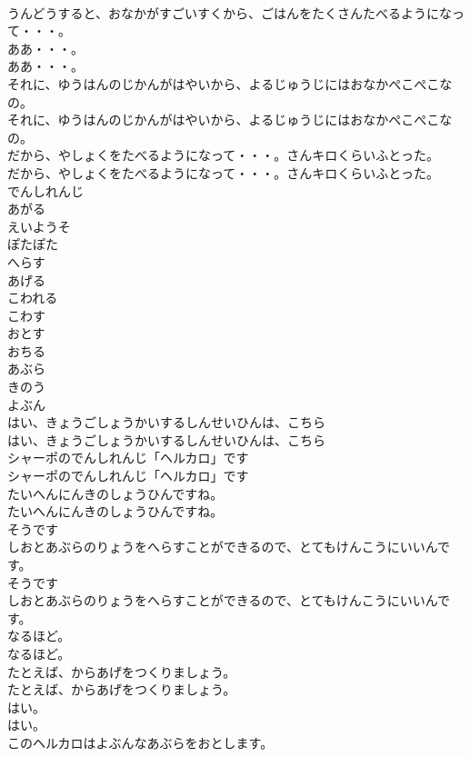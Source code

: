 \documentclass[8pt]{extreport}
\begin{document}
\begin{CJK}{UTF8}{min}
\\	うんどうすると、おなかがすごいすくから、ごはんをたくさんたべるようになって・・・。
\\	ああ・・・。
\\	ああ・・・。
\\	それに、ゆうはんのじかんがはやいから、よるじゅうじにはおなかぺこぺこなの。
\\	それに、ゆうはんのじかんがはやいから、よるじゅうじにはおなかぺこぺこなの。
\\	だから、やしょくをたべるようになって・・・。さんキロくらいふとった。
\\	だから、やしょくをたべるようになって・・・。さんキロくらいふとった。
\\	でんしれんじ
\\	あがる
\\	えいようそ
\\	ぽたぽた
\\	へらす
\\	あげる
\\	こわれる
\\	こわす
\\	おとす
\\	おちる
\\	あぶら
\\	きのう
\\	よぶん
\\	はい、きょうごしょうかいするしんせいひんは、こちら
\\	はい、きょうごしょうかいするしんせいひんは、こちら
\\	シャーポのでんしれんじ「ヘルカロ」です
\\	シャーポのでんしれんじ「ヘルカロ」です
\\	たいへんにんきのしょうひんですね。
\\	たいへんにんきのしょうひんですね。
\\	そうです
\\	しおとあぶらのりょうをへらすことができるので、とてもけんこうにいいんです。
\\	そうです
\\	しおとあぶらのりょうをへらすことができるので、とてもけんこうにいいんです。
\\	なるほど。
\\	なるほど。
\\	たとえば、からあげをつくりましょう。
\\	たとえば、からあげをつくりましょう。
\\	はい。
\\	はい。
\\	このヘルカロはよぶんなあぶらをおとします。

\end{CJK}
\end{document}

